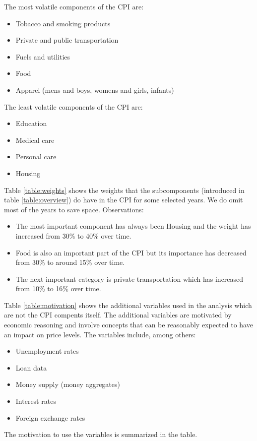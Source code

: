 \documentclass[12pt]{article}
\begin{document}
The most volatile components of the CPI are: 
\begin{itemize}
\item Tobacco and smoking products
\item Private and public transportation
\item Fuels and utilities 
\item Food
\item Apparel (mens and boys, womens and girls, infants)
\end{itemize}


The least volatile components of the CPI are: 
\begin{itemize}
\item Education
\item Medical care
\item Personal care
\item Housing
\end{itemize}

Table \ref{table:weights} shows the weights that the subcomponents (introduced in table \ref{table:overview}) do have in the CPI for some selected years. We do omit most of the years to save space. 
Observations:
\begin{itemize}
\item The most important component has always been Housing and the weight has increased  from 30\% to 40\% over time. 
\item Food is also an important part of the CPI but its importance has decreased from 30\% to around 15\% over time. 
\item The next important category is private transportation which has increased from 10\% to 16\% over time. 
\end{itemize}


Table \ref{table:motivation} shows the additional variables used in the analysis which are not the CPI compents itself. The additional variables are motivated by economic reasoning and involve concepts that can be reasonably expected to have an impact on price levels. The variables include, among others:
\begin{itemize}
\item Unemployment rates
\item Loan data
\item Money supply (money aggregates)
\item Interest rates
\item Foreign exchange rates
\end{itemize}
The motivation to use the variables is summarized in the table.
\end{document}
